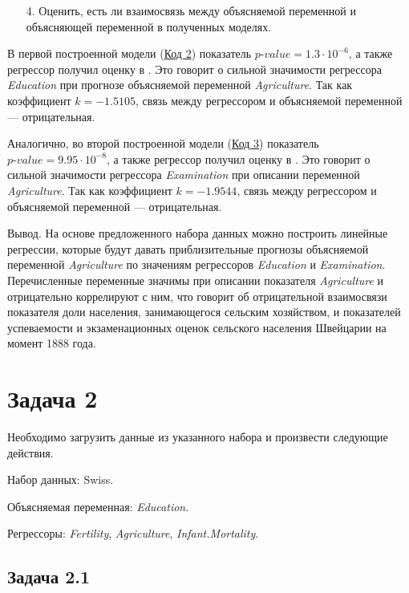 \begin{enumerate}
    \item[4.] Оценить, есть ли взаимосвязь между объясняемой переменной и объясняющей переменной в полученных моделях.
\end{enumerate}

В первой построенной модели (\hyperref[code:2]{Код 2}) показатель $\textit{p-value} = 1.3 \cdot 10^{-6}$, а также регрессор получил оценку в \textquote{***}. Это говорит о сильной значимости регрессора \textit{Education} при прогнозе объясняемой переменной \textit{Agriculture}. Так как коэффициент $k = -1.5105$, связь между регрессором и объясняемой переменной --- отрицательная.

Аналогично, во второй построенной модели (\hyperref[code:3]{Код 3}) показатель $\textit{p-value} = 9.95 \cdot 10^{-8}$, а также регрессор получил оценку в \textquote{***}. Это говорит о сильной значимости регрессора \textit{Examination} при описании переменной \textit{Agriculture}. Так как коэффициент $k = -1.9544$, связь между регрессором и объясняемой переменной --- отрицательная.

Вывод. На основе предложенного набора данных можно построить линейные регрессии, которые будут давать приблизительные прогнозы объясняемой переменной \textit{Agriculture} по значениям регрессоров \textit{Education} и \textit{Examination}. Перечисленные переменные значимы при описании показателя \textit{Agriculture} и отрицательно коррелируют с ним, что говорит об отрицательной взаимосвязи показателя доли населения, занимающегося сельским хозяйством, и показателей успеваемости и экзаменационных оценок сельского населения Швейцарии на момент 1888 года.


\newpage
{}
\section{Задача 2}

Необходимо загрузить данные из указанного набора и произвести следующие действия.

Набор данных: Swiss.

Объясняемая переменная: \textit{Education}.

Регрессоры: \textit{Fertility}, \textit{Agriculture}, \textit{Infant.Mortality}.

\subsection{Задача 2.1}

